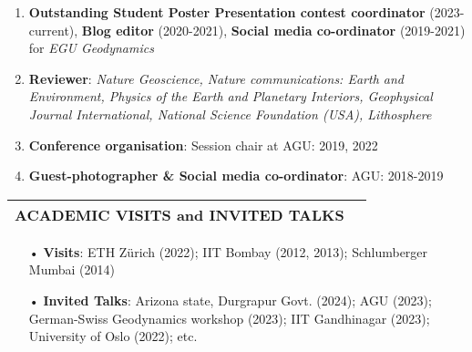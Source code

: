 \documentclass[11pt,a4paper]{article}
\begin{document}
\begin{enumerate}[noitemsep]
\vspace{-0.1 in}
\item \textbf{Outstanding Student Poster Presentation contest coordinator} (2023-current), \textbf{Blog editor} (2020-2021), \textbf{Social media co-ordinator} (2019-2021) for \textit{EGU Geodynamics}

\item \textbf{Reviewer}: \textit{Nature Geoscience, Nature communications: Earth and Environment, Physics of the Earth and Planetary Interiors, Geophysical Journal International, National Science Foundation (USA), Lithosphere}

\item \textbf{Conference organisation}: Session chair at AGU: 2019, 2022

\item \textbf{Guest-photographer \& Social media co-ordinator}: AGU: 2018-2019
\end{enumerate}  

\vspace{-0.3 in}
\begin{longtable}{p{10cm} p{5 cm}}
\hline
\textbf{ACADEMIC VISITS and INVITED TALKS} &  \\
\hline
\end{longtable}
\vspace{-0.3 in}
\begin{enumerate}[noitemsep]
\item[•] \textbf{Visits}:  ETH Zürich (2022); IIT Bombay (2012, 2013); Schlumberger Mumbai (2014)
\item[•] \textbf{Invited Talks}: Arizona state, Durgrapur Govt. (2024); AGU (2023); German-Swiss Geodynamics workshop (2023); IIT Gandhinagar (2023); University of Oslo (2022); etc.
\end{enumerate}
\end{document}
